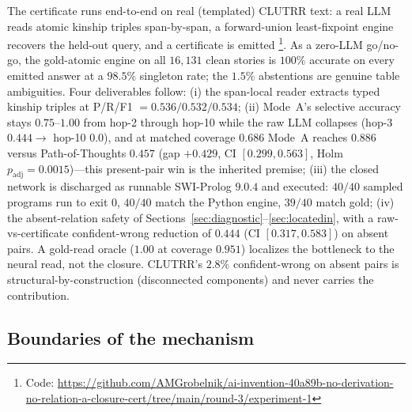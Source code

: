 \documentclass[11pt,letterpaper]{article}
\begin{document}
The certificate runs end-to-end on real (templated) CLUTRR text: a real LLM reads atomic kinship triples span-by-span, a forward-union least-fixpoint engine recovers the held-out query, and a certificate is emitted \footnote{Code: \url{https://github.com/AMGrobelnik/ai-invention-40a89b-no-derivation-no-relation-a-closure-cert/tree/main/round-3/experiment-1}}. As a zero-LLM go/no-go, the gold-atomic engine on all $16{,}131$ clean stories is $100\%$ accurate on every emitted answer at a $98.5\%$ singleton rate; the $1.5\%$ abstentions are genuine table ambiguities. Four deliverables follow: (i) the span-local reader extracts typed kinship triples at P/R/F1 $=0.536/0.532/0.534$; (ii) Mode~A's selective accuracy stays $0.75$--$1.00$ from hop-2 through hop-10 while the raw LLM collapses (hop-3 $0.444\rightarrow$ hop-10 $0.0$), and at matched coverage $0.686$ Mode~A reaches $0.886$ versus Path-of-Thoughts $0.457$ (gap $+0.429$, CI $[0.299,0.563]$, Holm $p_{\text{adj}}{=}0.0015$)---this present-pair win is the inherited premise; (iii) the closed network is discharged as runnable SWI-Prolog $9.0.4$ and executed: $40/40$ sampled programs run to exit $0$, $40/40$ match the Python engine, $39/40$ match gold; (iv) the absent-relation safety of Sections~\ref{sec:diagnostic}--\ref{sec:locatedin}, with a raw-vs-certificate confident-wrong reduction of $0.444$ (CI $[0.317,0.583]$) on absent pairs. A gold-read oracle ($1.00$ at coverage $0.951$) localizes the bottleneck to the neural read, not the closure. CLUTRR's $2.8\%$ confident-wrong on absent pairs is structural-by-construction (disconnected components) and never carries the contribution.

\subsection{Boundaries of the mechanism}
\label{sec:boundaries}
\end{document}
